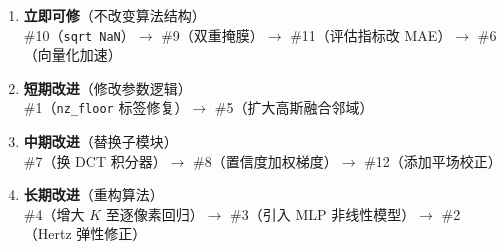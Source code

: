 \begin{enumerate}
  \item \textbf{立即可修}（不改变算法结构）\\
        \#10（\texttt{sqrt~NaN}）$\to$
        \#9（双重掩膜）$\to$
        \#11（评估指标改 MAE）$\to$
        \#6（向量化加速）

  \item \textbf{短期改进}（修改参数逻辑）\\
        \#1（\texttt{nz\_floor} 标签修复）$\to$
        \#5（扩大高斯融合邻域）

  \item \textbf{中期改进}（替换子模块）\\
        \#7（换 DCT 积分器）$\to$
        \#8（置信度加权梯度）$\to$
        \#12（添加平场校正）

  \item \textbf{长期改进}（重构算法）\\
        \#4（增大 $K$ 至逐像素回归）$\to$
        \#3（引入 MLP 非线性模型）$\to$
        \#2（Hertz 弹性修正）
\end{enumerate}

\newpage




